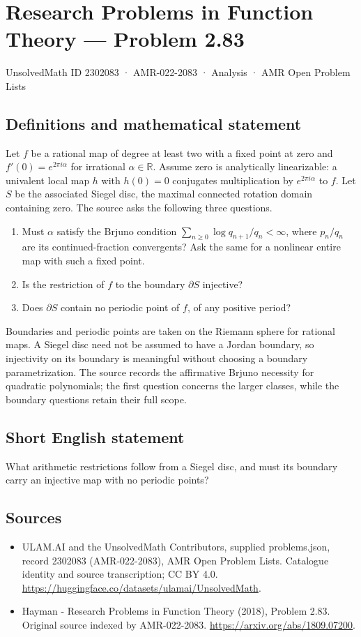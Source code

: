 \documentclass[11pt,a4paper]{article}
\begin{document}
\section*{Research Problems in Function Theory — Problem 2.83}\label{2302083}
{\small UnsolvedMath ID 2302083 · AMR-022-2083 · Analysis · AMR Open Problem Lists}
\subsection{Definitions and mathematical statement}
Let $f$ be a rational map of degree at least two with a fixed point at zero and
$f'(0)=e^{2\pi i\alpha}$ for irrational $\alpha\in\mathbb R$.
Assume zero is analytically linearizable: a univalent local map $h$ with $h(0)=0$ conjugates multiplication by $e^{2\pi i\alpha}$ to $f$. Let $S$ be the associated Siegel disc, the maximal connected rotation domain containing zero.
The source asks the following three questions.
\begin{enumerate}
\item Must $\alpha$ satisfy the Brjuno condition
$\sum_{n\ge0}\log q_{n+1}/q_n<\infty$, where $p_n/q_n$ are its continued-fraction convergents? Ask the same for a nonlinear entire map with such a fixed point.
\item Is the restriction of $f$ to the boundary $\partial S$ injective?
\item Does $\partial S$ contain no periodic point of $f$, of any positive period?
\end{enumerate}
Boundaries and periodic points are taken on the Riemann sphere for rational maps. A Siegel disc need not be assumed to have a Jordan boundary, so injectivity on its boundary is meaningful without choosing a boundary parametrization. The source records the affirmative Brjuno necessity for quadratic polynomials; the first question concerns the larger classes, while the boundary questions retain their full scope.
\subsection{Short English statement}
What arithmetic restrictions follow from a Siegel disc, and must its boundary carry an injective map with no periodic points?
\subsection{Sources}
\begin{itemize}
\item[S1] ULAM.AI and the UnsolvedMath Contributors, supplied problems.json, record 2302083 (AMR-022-2083), AMR Open Problem Lists. Catalogue identity and source transcription; CC BY 4.0.
\url{https://huggingface.co/datasets/ulamai/UnsolvedMath}.
\item[S2] Hayman - Research Problems in Function Theory (2018), Problem 2.83. Original source indexed by AMR-022-2083.
\url{https://arxiv.org/abs/1809.07200}.
\end{itemize}
\end{document}
